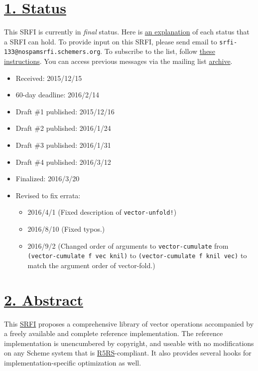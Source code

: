 \section{\texorpdfstring{\href{}{1. Status}}{1. Status}}\label{status}

This SRFI is currently in \emph{final} status. Here is
\href{http://srfi.schemers.org/srfi-process.html}{an explanation} of
each status that a SRFI can hold. To provide input on this SRFI, please
send email to \texttt{srfi-133@nospamsrfi.schemers.org}. To subscribe to
the list, follow
\href{http://srfi.schemers.org/srfi-list-subscribe.html}{these
instructions}. You can access previous messages via the mailing list
\href{http://srfi-email.schemers.org/srfi-133}{archive}.

\begin{itemize}
\tightlist
\item
  Received: 2015/12/15
\item
  60-day deadline: 2016/2/14
\item
  Draft \#1 published: 2015/12/16
\item
  Draft \#2 published: 2016/1/24
\item
  Draft \#3 published: 2016/1/31
\item
  Draft \#4 published: 2016/3/12
\item
  Finalized: 2016/3/20
\item
  Revised to fix errata:

  \begin{itemize}
  \tightlist
  \item
    2016/4/1 (Fixed description of \texttt{vector-unfold!})
  \item
    2016/8/10 (Fixed typos.)
  \item
    2016/9/2 (Changed order of arguments to \texttt{vector-cumulate}
    from \texttt{(vector-cumulate\ f\ vec\ knil)} to
    \texttt{(vector-cumulate\ f\ knil\ vec)} to match the argument order
    of vector-fold.)
  \end{itemize}
\end{itemize}

\section{\texorpdfstring{\href{}{2.
Abstract}}{2. Abstract}}\label{abstract}

This \protect\hyperlink{SRFI}{SRFI} proposes a comprehensive library of
vector operations accompanied by a freely available and complete
reference implementation. The reference implementation is unencumbered
by copyright, and useable with no modifications on any Scheme system
that is \protect\hyperlink{R5RS}{R5RS}-compliant. It also provides
several hooks for implementation-specific optimization as well.


